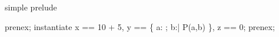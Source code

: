 \begin{zsection}
   \SECTION simple \parents prelude
\end{zsection}

\begin{zproof}[qntCmd]
prenex;
instantiate x == 10 + 5, y == \{ a: \nat; b:\nat | P(a,b) \},
    z == 0;
prenex;
\end{zproof}

